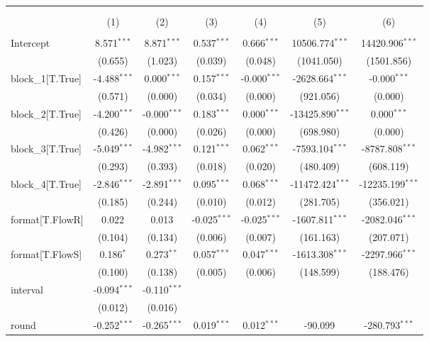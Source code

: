 \begin{table}[!htbp] \centering
\begin{tabular}{@{\extracolsep{5pt}}lcccccc}
\\[-1.8ex]\hline
\hline \\[-1.8ex]
\\[-1.8ex] & (1) & (2) & (3) & (4) & (5) & (6) \\
\hline \\[-1.8ex]
 Intercept & 8.571$^{***}$ & 8.871$^{***}$ & 0.537$^{***}$ & 0.666$^{***}$ & 10506.774$^{***}$ & 14420.906$^{***}$ \\
& (0.655) & (1.023) & (0.039) & (0.048) & (1041.050) & (1501.856) \\
 block_1[T.True] & -4.488$^{***}$ & 0.000$^{***}$ & 0.157$^{***}$ & -0.000$^{***}$ & -2628.664$^{***}$ & -0.000$^{***}$ \\
& (0.571) & (0.000) & (0.034) & (0.000) & (921.056) & (0.000) \\
 block_2[T.True] & -4.200$^{***}$ & -0.000$^{***}$ & 0.183$^{***}$ & 0.000$^{***}$ & -13425.890$^{***}$ & 0.000$^{***}$ \\
& (0.426) & (0.000) & (0.026) & (0.000) & (698.980) & (0.000) \\
 block_3[T.True] & -5.049$^{***}$ & -4.982$^{***}$ & 0.121$^{***}$ & 0.062$^{***}$ & -7593.104$^{***}$ & -8787.808$^{***}$ \\
& (0.293) & (0.393) & (0.018) & (0.020) & (480.409) & (608.119) \\
 block_4[T.True] & -2.846$^{***}$ & -2.891$^{***}$ & 0.095$^{***}$ & 0.068$^{***}$ & -11472.424$^{***}$ & -12235.199$^{***}$ \\
& (0.185) & (0.244) & (0.010) & (0.012) & (281.705) & (356.021) \\
 format[T.FlowR] & 0.022$^{}$ & 0.013$^{}$ & -0.025$^{***}$ & -0.025$^{***}$ & -1607.811$^{***}$ & -2082.046$^{***}$ \\
& (0.104) & (0.134) & (0.006) & (0.007) & (161.163) & (207.071) \\
 format[T.FlowS] & 0.186$^{*}$ & 0.273$^{**}$ & 0.057$^{***}$ & 0.047$^{***}$ & -1613.308$^{***}$ & -2297.966$^{***}$ \\
& (0.100) & (0.138) & (0.005) & (0.006) & (148.599) & (188.476) \\
 interval & -0.094$^{***}$ & -0.110$^{***}$ & & & & \\
& (0.012) & (0.016) & & & & \\
 round & -0.252$^{***}$ & -0.265$^{***}$ & 0.019$^{***}$ & 0.012$^{***}$ & -90.099$^{}$ & -280.793$^{***}$ \\

\end{tabular}
\end{table}
